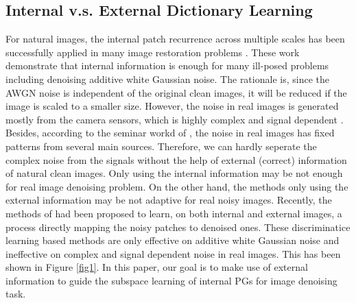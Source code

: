 \documentclass[10pt,twocolumn,letterpaper]{article}
\begin{document}
\subsection{Internal v.s. External Dictionary Learning}
For natural images, the internal patch recurrence across multiple scales has been successfully applied in many image restoration problems \cite{Irani2009sr,Irani2013separating,Irani2014deblur,Irani2016dehazing}. These work demonstrate that internal information is enough for many ill-posed problems including denoising additive white Gaussian noise. The rationale is, since the AWGN noise is independent of the original clean images, it will be reduced if the image is scaled to a smaller size. However, the noise in real images is generated mostly from the camera sensors, which is highly complex and signal dependent \cite{crosschannel2016}. Besides, according to the seminar workd of \cite{healey1994radiometric}, the noise in real images has fixed patterns from several main sources. Therefore, we can hardly seperate the complex noise from the signals without the help of external (correct) information of natural clean images. Only using the internal information may be not enough for real image denoising problem. On the other hand, the methods only using the external information may be not adaptive for real noisy images. Recently, the methods of \cite{mlp,csf,chen2015learning} had been proposed to learn, on both internal and external images, a process directly mapping the noisy patches to denoised ones. These discriminatice learning based methods are only effective on additive white Gaussian noise and ineffective on complex and signal dependent noise in real images. This has been shown in Figure \ref{fig1}. In this paper, our goal is to make use of external information to guide the subspace learning of internal PGs for image denoising task.
\end{document}
